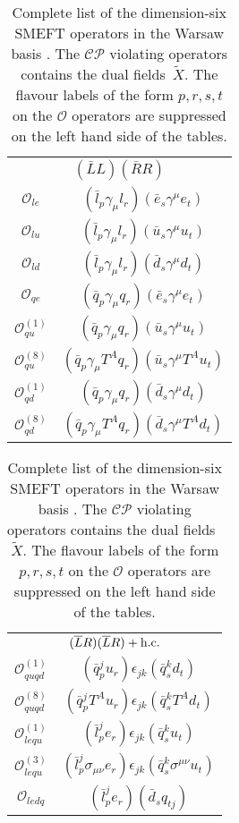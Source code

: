 \begin{table}
\begin{center}
		\begin{minipage}[t]{4.95cm}
			\renewcommand{\arraystretch}{1.5}
			\begin{tabular}[t]{c|c}
				\multicolumn{2}{c}{$(\bar LL)(\bar RR)$} \\
				\toplinetwo
				$\mathcal{O}_{le}$               & $(\bar l_p \gamma_\mu l_r)(\bar e_s \gamma^\mu e_t)$ \\
				$\mathcal{O}_{lu}$               & $(\bar l_p \gamma_\mu l_r)(\bar u_s \gamma^\mu u_t)$ \\
				$\mathcal{O}_{ld}$               & $(\bar l_p \gamma_\mu l_r)(\bar d_s \gamma^\mu d_t)$ \\
				$\mathcal{O}_{qe}$               & $(\bar q_p \gamma_\mu q_r)(\bar e_s \gamma^\mu e_t)$ \\
				$\mathcal{O}_{qu}^{(1)}$         & $(\bar q_p \gamma_\mu q_r)(\bar u_s \gamma^\mu u_t)$ \\ 
				$\mathcal{O}_{qu}^{(8)}$         & $(\bar q_p \gamma_\mu T^A q_r)(\bar u_s \gamma^\mu T^A u_t)$ \\ 
				$\mathcal{O}_{qd}^{(1)}$ & $(\bar q_p \gamma_\mu q_r)(\bar d_s \gamma^\mu d_t)$ \\
				$\mathcal{O}_{qd}^{(8)}$ & $(\bar q_p \gamma_\mu T^A q_r)(\bar d_s \gamma^\mu T^A d_t)$\\
			\end{tabular}
		\end{minipage}
		\begin{minipage}[t]{5.45 cm}
			\renewcommand{\arraystretch}{1.5}
			\begin{tabular}[t]{c|c}
				\multicolumn{2}{c}{$(\bar LR)(\bar L R)+\hbox{h.c.}$} \\
				\toplinetwo
				$\mathcal{O}_{quqd}^{(1)}$ & $(\bar q_p^j u_r) \epsilon_{jk} (\bar q_s^k d_t)$ \\
				$\mathcal{O}_{quqd}^{(8)}$ & $(\bar q_p^j T^A u_r) \epsilon_{jk} (\bar q_s^k T^A d_t)$ \\
				$\mathcal{O}_{lequ}^{(1)}$ & $(\bar l_p^j e_r) \epsilon_{jk} (\bar q_s^k u_t)$ \\
				$\mathcal{O}_{lequ}^{(3)}$ & $(\bar l_p^j \sigma_{\mu\nu} e_r) \epsilon_{jk} (\bar q_s^k \sigma^{\mu\nu} u_t)$\\
			 $\mathcal{O}_{ledq}$ & $(\bar l_p^j e_r)(\bar d_s q_{tj})$ 
			\end{tabular}
		\end{minipage}
	\end{center}
		\vspace{-.35cm}
	\caption{\label{warsaw}
	  Complete list of the dimension-six SMEFT operators in the Warsaw basis 
		\cite{Grzadkowski:2010es}. The $\mathcal{CP}$ violating operators contains the dual fields~$\widetilde X$. The flavour labels of the form $p,r,s,t$ on the $\mathcal{O}$ operators are suppressed on the left hand side of
		the tables.}
\end{table}